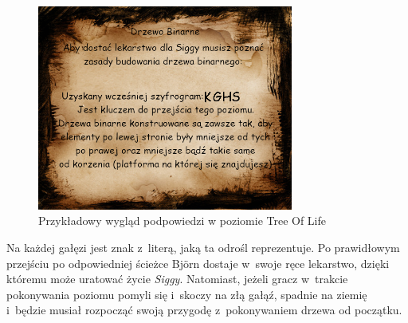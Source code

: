 \documentclass[12pt,a4paper,oneside]{book}
\theoremstyle{definition}
\numberwithin{equation}{chapter}
\begin{document}
\begin{figure}[hpt!]
        \centering
        \includegraphics[width=0.75\textwidth]{podpowiedzi/binarytreehelp.png}
        \caption{Przykładowy wygląd podpowiedzi w poziomie Tree Of Life}
        \label{TreeOfLifeHelper}
    \end{figure}
    \newpage
\par Na każdej gałęzi jest znak z~literą, jaką ta odrośl reprezentuje. Po prawidłowym przejściu po odpowiedniej ścieżce Björn dostaje w~swoje ręce lekarstwo, dzięki któremu może uratować życie \textit{Siggy}. Natomiast, jeżeli gracz w~trakcie pokonywania poziomu pomyli się i~skoczy na złą gałąź, spadnie na ziemię i~będzie musiał rozpocząć swoją przygodę z~pokonywaniem drzewa od początku.
    
\end{document}
